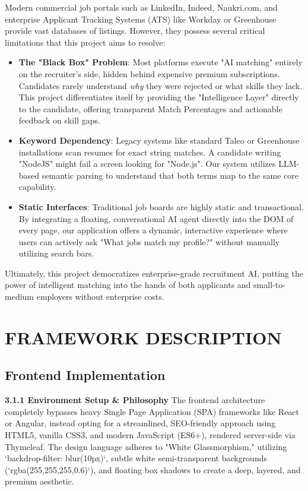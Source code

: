 \documentclass[12pt]{report}
\begin{document}
Modern commercial job portals such as LinkedIn, Indeed, Naukri.com, and enterprise Applicant Tracking Systems (ATS) like Workday or Greenhouse provide vast databases of listings. However, they possess several critical limitations that this project aims to resolve:
\begin{itemize}
    \item \textbf{The "Black Box" Problem}: Most platforms execute "AI matching" entirely on the recruiter’s side, hidden behind expensive premium subscriptions. Candidates rarely understand \textit{why} they were rejected or what skills they lack. This project differentiates itself by providing the "Intelligence Layer" directly to the candidate, offering transparent Match Percentages and actionable feedback on skill gaps.
    \item \textbf{Keyword Dependency}: Legacy systems like standard Taleo or Greenhouse installations scan resumes for exact string matches. A candidate writing "NodeJS" might fail a screen looking for "Node.js". Our system utilizes LLM-based semantic parsing to understand that both terms map to the same core capability.
    \item \textbf{Static Interfaces}: Traditional job boards are highly static and transactional. By integrating a floating, conversational AI agent directly into the DOM of every page, our application offers a dynamic, interactive experience where users can actively ask "What jobs match my profile?" without manually utilizing search bars.
\end{itemize}
Ultimately, this project democratizes enterprise-grade recruitment AI, putting the power of intelligent matching into the hands of both applicants and small-to-medium employers without enterprise costs.


\chapter{FRAMEWORK DESCRIPTION} 
\linespread{1.5}\selectfont 

\section{Frontend Implementation} 
\textbf{3.1.1 Environment Setup \& Philosophy}
The frontend architecture completely bypasses heavy Single Page Application (SPA) frameworks like React or Angular, instead opting for a streamlined, SEO-friendly approach using HTML5, vanilla CSS3, and modern JavaScript (ES6+), rendered server-side via Thymeleaf. The design language adheres to "White Glassmorphism," utilizing `backdrop-filter: blur(10px)`, subtle white semi-transparent backgrounds (`rgba(255,255,255,0.6)`), and floating box shadows to create a deep, layered, and premium aesthetic.
\end{document}
